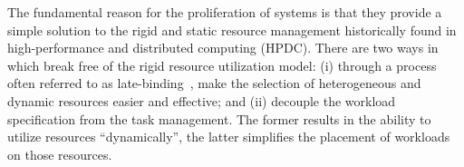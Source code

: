 \documentclass{sig-alternate}
\begin{document}



The fundamental reason for the proliferation of \pilotjob systems is that they
provide a simple solution to the rigid and static resource management
historically found in high-performance and distributed computing (HPDC).  There
are two ways in which \pilotjobs break free of the rigid resource utilization
model: (i) through a process often referred to as
late-binding~\cite{moscicki2011,glatard2010,delgado2014}, \pilotjobs make the
selection of heterogeneous and dynamic resources easier and effective; and (ii)
\pilotjobs decouple the workload specification from the task management.  The
former results in the ability to utilize resources ``dynamically'', the latter
simplifies the placement of workloads on those resources.


\end{document}
